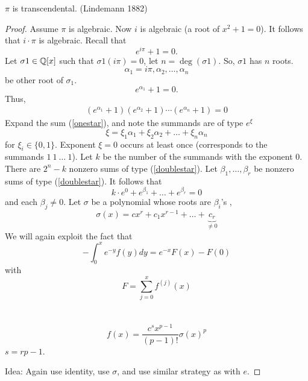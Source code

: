 \documentclass[NumTh.tex]{subfiles}
\begin{document}
\begin{theorem}
  $\pi$ is transcendental. (Lindemann 1882)
\end{theorem}

\begin{proof}
  Assume $\pi$ is algebraic.
  Now $i$ is algebraic (a root of $x^2+1 = 0$).
  It follows that $i \cdot \pi$ is algebraic.
  Recall that
  \[ e^{i \pi} +1 = 0 \text{.} \]
  Let $\sigma1 \in \mathbb{Q}[x]$ such that $\sigma1(i \pi) = 0$,
  let $n = \deg(\sigma1)$.
  So, $\sigma1$ has $n$ roots.
  \[ \alpha_1 = i \pi, \alpha_2,\dots,\alpha_n \]
  be other root of $\sigma_1$.
  \[ e^{\alpha_1} + 1 = 0 \text{.} \]
  Thus,
  \begin{align}\label{onestar}
    (e^{\alpha_1} + 1)(e^{\alpha_2} + 1) \cdots (e^{\alpha_n} + 1) = 0
  \end{align}
  Expand the sum (\ref{onestar}), and note the summands are of type $e^\xi$
  \[ \xi = \xi_1 \alpha_1 + \xi_2 \alpha_2 + \dots + \xi_n \alpha_n \]
  for $\xi_i \in \{0,1\}$.
  Exponent $\xi = 0$ occurs at least once (corresponds to the summands $1 \: 1 \: \dots \: 1$).
  Let $k$ be the number of the summands with the exponent $0$.
  There are $2^n-k$ nonzero sums of type (\ref{doublestar}).
  Let $\beta_1,\dots,\beta_r$ be nonzero sums of type (\ref{doublestar}).
  It follows that 
  \[ k \cdot e^0 + e^{\beta_1} + \dots + e^{\beta_r} = 0 \]
  and each $\beta_j \neq 0$.
  Let $\sigma$ be a polynomial whose roots are $\beta_i$'s ,
  \[ \sigma(x) = c x^r + c_1 x^{r-1} + \dots + \underbrace{c_r}_{\neq 0} \]
  We will again exploit the fact that 
  \[ - \int_0^x e^{-y} f(y) dy = e^{-x} F(x) - F(0) \]
  with
  \[ F = \sum_{j=0}^x f^{(j)}(x) \]
  \\
  \\
  \[ f(x) = \frac{c^s x^{p-1}}{(p-1)!} \sigma(x)^p \]
  $s = rp -1$.
  
  Idea: Again use identity, use $\sigma$, and use similar strategy as with $e$.
\end{proof}
\end{document}
